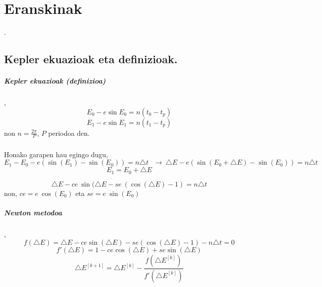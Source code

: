 \chapter{Eranskinak}.

\section{Kepler ekuazioak eta definizioak.}

\paragraph*{\textbf{Kepler ekuazioak (definizioa)}},
\begin{equation*}
E_0-e\sin E_0=n (t_0-t_p)
\end{equation*}
\begin{equation*}
E_1-e\sin E_1=n (t_1-t_p)
\end{equation*}
non $n=\frac{2\pi}{P}$, $P$ periodoa den.

\paragraph*{} Honako garapen hau egingo dugu,
\begin{equation*}
E_1-E_0-e(\sin(E_1)-\sin(E_0))=n \triangle t \ \ \ \longrightarrow \ \triangle E - e(\sin(E_0+\triangle E)-\sin(E_0))=n \triangle t
\end{equation*}
\begin{equation*}
E_1=E_0+\triangle E  
\end{equation*}

\begin{equation*}
\triangle E - ce \ \sin(\triangle E- se \ (\cos(\triangle E)-1)=n \triangle t
\end{equation*}
non, $ce=e \ \cos(E_0)$ eta $se=e \ \sin(E_0)$

\paragraph*{\textbf{Newton metodoa}},
\begin{equation*}
f(\triangle E)=\triangle E - ce \sin(\triangle E)- se (\cos(\triangle E)-1)-n \triangle t=0
\end{equation*}
\begin{equation*}
f'(\triangle E)=1-ce \cos(\triangle E)+ se \sin(\triangle E)
\end{equation*}
\begin{equation}
\triangle E^{[k+1]}=\triangle E^{[k]}- \frac{f(\triangle E^{[k]})}{f'(\triangle E^{[k]})}
\end{equation}

